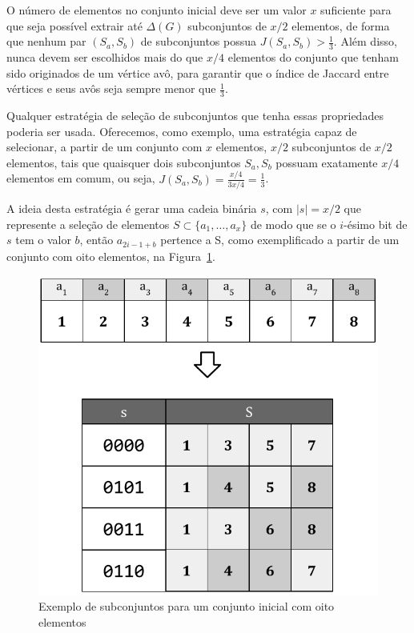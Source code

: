 O número de elementos no conjunto inicial deve ser um valor $x$ suficiente para que seja possível extrair até $\Delta(G)$ subconjuntos de $x/2$ elementos, de forma que nenhum par $(S_a, S_b)$ de subconjuntos possua $J(S_a, S_b) > \frac{1}{3}$. Além disso, nunca devem ser escolhidos mais do que $x/4$ elementos do conjunto que tenham sido originados de um vértice avô, para garantir que o índice de Jaccard entre vértices e seus avôs seja sempre menor que $\frac{1}{3}$.

Qualquer estratégia de seleção de subconjuntos que tenha essas propriedades poderia ser usada. Oferecemos, como exemplo, uma estratégia capaz de selecionar, a partir de um conjunto com $x$ elementos, $x/2$ subconjuntos de $x/2$ elementos, tais que quaisquer dois subconjuntos $S_a, S_b$ possuam exatamente $x/4$ elementos em comum, ou seja, $J(S_a, S_b) = \frac{x/4}{3x/4} = \frac{1}{3}$.

A ideia desta estratégia é gerar uma cadeia binária $s$, com $|s|=x/2$ que represente a seleção de elementos $S \subset \{a_1,\ldots,a_x\}$ de modo que se o $i$-ésimo bit de $s$ tem o valor $b$, então $a_{2i-1+b}$ pertence a S, como exemplificado a partir de um conjunto com oito elementos, na Figura~\ref{fig:graph_tree_bintable}.

\begin{figure}[!htbp]
  \centering
  \includegraphics[scale=0.6]{figures/graphs_tree_bintable.pdf}
  \caption{Exemplo de subconjuntos para um conjunto inicial com oito elementos}
  \label{fig:graph_tree_bintable}
\end{figure}

